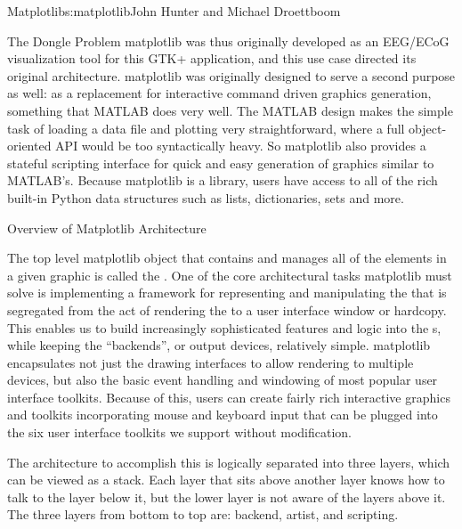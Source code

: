\begin{aosachapter}{Matplotlib}{s:matplotlib}{John Hunter and Michael Droettboom}
\begin{aosasect1}{The Dongle Problem}
matplotlib was thus originally developed as an EEG/ECoG visualization
tool for this GTK+ application, and this use case directed its
original architecture.  matplotlib was originally designed to serve a
second purpose as well: as a replacement for interactive command
driven graphics generation, something that MATLAB does very well.  The
MATLAB design makes the simple task of loading a data file and
plotting very straightforward, where a full object-oriented API would
be too syntactically heavy.  So matplotlib also provides a stateful
scripting interface for quick and easy generation of graphics similar
to MATLAB's.  Because matplotlib is a library, users have access to
all of the rich built-in Python data structures such as lists,
dictionaries, sets and more.


\end{aosasect1}

\begin{aosasect1}{Overview of Matplotlib Architecture}

The top level matplotlib object that contains and manages all of the
elements in a given graphic is called the .  One of the
core architectural tasks matplotlib must solve is implementing a
framework for representing and manipulating the  that
is segregated from the act of rendering the  to a user
interface window or hardcopy.  This enables us to build increasingly
sophisticated features and logic into the s, while
keeping the ``backends'', or output devices, relatively simple.
matplotlib encapsulates not just the drawing interfaces to allow
rendering to multiple devices, but also the basic event
handling and windowing of most popular user interface toolkits.
Because of this, users can create fairly rich interactive graphics
and toolkits incorporating mouse and keyboard input that can be
plugged into the six user interface toolkits we support without
modification.

The architecture to accomplish this is logically separated into three
layers, which can be viewed as a stack.  Each layer that sits above
another layer knows how to talk to the layer below it, but the lower
layer is not aware of the layers above it.  The three layers from
bottom to top are: backend, artist, and scripting.



\end{aosasect1}
\end{aosachapter}
